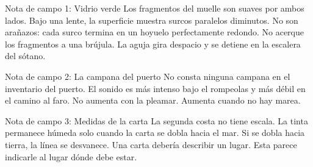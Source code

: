 \begin{fieldnote}{Nota de campo 1: Vidrio verde}
Los fragmentos del muelle son suaves por ambos lados. Bajo una lente, la
superficie muestra surcos paralelos diminutos. No son arañazos: cada surco
termina en un hoyuelo perfectamente redondo. No acerque los fragmentos a una
brújula. La aguja gira despacio y se detiene en la escalera del sótano.
\end{fieldnote}

\begin{fieldnote}{Nota de campo 2: La campana del puerto}
No consta ninguna campana en el inventario del puerto. El sonido es más
intenso bajo el rompeolas y más débil en el camino al faro. No aumenta con
la pleamar. Aumenta cuando no hay marea.
\end{fieldnote}

\begin{fieldnote}{Nota de campo 3: Medidas de la carta}
La segunda costa no tiene escala. La tinta permanece húmeda solo cuando la
carta se dobla hacia el mar. Si se dobla hacia tierra, la línea se desvanece.
Una carta debería describir un lugar. Esta parece indicarle al lugar dónde
debe estar.
\end{fieldnote}
